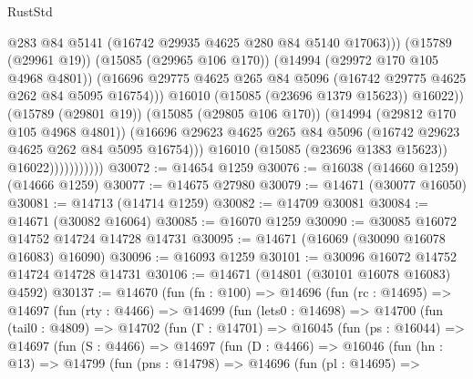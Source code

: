 \begin{lexlean}{RustStd}
\begin{coremodule}
                                      @283
                                      @84
                                      @5141
                                      (@16742 @29935 @4625 @280 @84 @5140 @17063)))
                                  (@15789 (@29961 @19))
                                  (@15085 (@29965 @106 @170))
                                  (@14994 (@29972 @170 @105 @4968 @4801))
                                  (@16696
                                    @29775
                                    @4625
                                    @265
                                    @84
                                    @5096
                                    (@16742 @29775 @4625 @262 @84 @5095 @16754)))
                                @16010
                                (@15085 (@23696 @1379 @15623))
                                @16022))
                            (@15789 (@29801 @19))
                            (@15085 (@29805 @106 @170))
                            (@14994 (@29812 @170 @105 @4968 @4801))
                            (@16696
                              @29623
                              @4625
                              @265
                              @84
                              @5096
                              (@16742 @29623 @4625 @262 @84 @5095 @16754)))
                          @16010
                          (@15085 (@23696 @1383 @15623))
                          @16022)))))))))))
@30072 := @14654 @1259
@30076 := @16038 (@14660 @1259) (@14666 @1259)
@30077 := @14675 @27980
@30079 := @14671 (@30077 @16050)
@30081 := @14713 (@14714 @1259)
@30082 := @14709 @30081
@30084 := @14671 (@30082 @16064)
@30085 := @16070 @1259
@30090 := @30085 @16072 @14752 @14724 @14728 @14731
@30095 := @14671 (@16069 (@30090 @16078 @16083) @16090)
@30096 := @16093 @1259
@30101 := @30096 @16072 @14752 @14724 @14728 @14731
@30106 := @14671 (@14801 (@30101 @16078 @16083) @4592)
@30137 := @14670
    (fun (fn : @100) =>
    @14696
      (fun (rc : @14695) =>
      @14697
        (fun (rty : @4466) =>
        @14699
          (fun (lets0 : @14698) =>
          @14700
            (fun (tail0 : @4809) =>
            @14702
              (fun (Γ : @14701) =>
              @16045
                (fun (ps : @16044) =>
                @14697
                  (fun (S : @4466) =>
                  @14697
                    (fun (D : @4466) =>
                    @16046
                      (fun (hn : @13) =>
                      @14799
                        (fun (pns : @14798) =>
                        @14696
                          (fun (pl : @14695) =>

\end{coremodule}
\end{lexlean}
